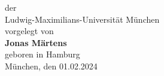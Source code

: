 \begin{titlepage}
\begin{center}
        \hspace*{-0.5cm}der\\
        \vspace*{0.1cm}
        \hspace*{-0.73cm}
        \hspace*{-0.5cm}Ludwig-Maximilians-Universität München\\
        \vspace*{3.5cm}
        \large
        \hspace*{-0.73cm}
        \hspace*{-0.8cm} vorgelegt von\\
        \vspace*{0.1cm}
        \hspace*{-0.73cm}
        \hspace*{-0.7cm}\Large \textbf{Jonas Märtens}\\
        \vspace*{0.15cm}
        \large
        \hspace*{-0.73cm}
        \hspace*{-0.8cm} geboren in Hamburg\\
        \vspace*{2.5cm}
        \vspace*{0.4cm}
        \hspace*{-0.73cm}
        \hspace*{-0.43cm}München, den 01.02.2024\\
    \end{center}
\end{titlepage}


%
%
\clearpage{\pagestyle{empty}\cleardoublepage}
%



\cleardoublepage

\tableofcontents
\cleardoublepage
{}
\setcounter{page}{1}
